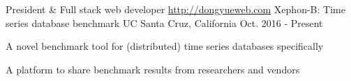 \begin{cventries}
    \cventry
      {President & Full stack web developer \url{http://dongyueweb.com}} %
      {Xephon-B: Time series database benchmark} %
      {UC Santa Cruz, California} %
      {Oct. 2016 - Present} %
      {
        \begin{cvitems} %
          \item {A novel benchmark tool for (distributed) time series databases specifically}
          \item {A platform to share benchmark results from researchers and vendors}
        \end{cvitems}
      }



\end{cventries}
